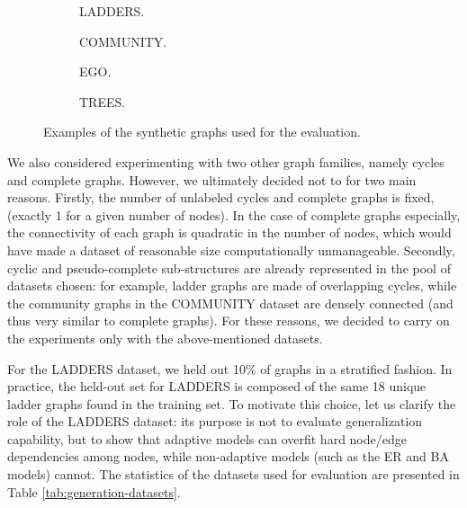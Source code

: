 \begin{figure}[h!]
    \begin{subfigure}[b]{0.24\linewidth}
        \centering
        \resizebox{.35\textwidth}{!}{}
        \caption{LADDERS.}
        \label{fig:ladder}
    \end{subfigure}
    \begin{subfigure}[b]{0.24\linewidth}
        \centering
        \resizebox{.8\textwidth}{!}{}
        \caption{COMMUNITY.}
        \label{fig:community}
    \end{subfigure}
    \begin{subfigure}[b]{0.24\linewidth}
        \centering
        \resizebox{.5\textwidth}{!}{}
        \caption{EGO.}
        \label{fig:ego}
    \end{subfigure}
    \begin{subfigure}[b]{0.24\linewidth}
        \centering
        \resizebox{.8\textwidth}{!}{}
        \caption{TREES.}
        \label{fig:btree}
    \end{subfigure}
    \caption{Examples of the synthetic graphs used for the evaluation.}
    \label{fig:synthetic-graphs}
\end{figure}
We also considered experimenting with two other graph families, namely cycles and complete graphs. However, we ultimately decided not to for two main reasons. Firstly, the number of unlabeled cycles and complete graphs is fixed, (exactly 1 for a given number of nodes). In the case of complete graphs especially, the connectivity of each graph is quadratic in the number of nodes, which would have made a dataset of reasonable size computationally unmanageable. Secondly, cyclic and pseudo-complete sub-structures are already represented in the pool of datasets chosen: for example, ladder graphs are made of overlapping cycles, while the community graphs in the COMMUNITY dataset are densely connected (and thus very similar to complete graphs). For these reasons, we decided to carry on the experiments only with the above-mentioned datasets.

For the LADDERS dataset, we held out 10\% of graphs in a stratified fashion. In practice, the held-out set for LADDERS is composed of the same 18 unique ladder graphs found in the training set. To motivate this choice, let us clarify the role of the LADDERS dataset: its purpose is not to evaluate generalization capability, but to show that adaptive models can overfit hard node/edge dependencies among nodes, while non-adaptive models (such as the ER and BA models) cannot. The statistics of the datasets used for evaluation are presented in Table \ref{tab:generation-datasets}.

